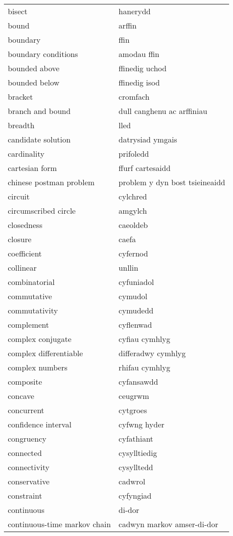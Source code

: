 \begin{supertabular}{p{0.22\textwidth}p{0.22\textwidth}}
bisect & hanerydd \\
bound & arffin \\
boundary & ffin \\
boundary conditions & amodau ffin \\
bounded above & ffinedig uchod \\
bounded below & ffinedig isod \\
bracket & cromfach \\
branch and bound & dull canghenu ac arffiniau \\
breadth & lled \\
candidate solution & datrysiad ymgais \\
cardinality & prifoledd \\
cartesian form & ffurf cartesaidd \\
chinese postman problem & problem y dyn bost tsieineaidd \\
circuit & cylchred \\
circumscribed circle & amgylch \\
closedness & caeoldeb \\
closure & caefa \\
coefficient & cyfernod \\
collinear & unllin \\
combinatorial & cyfuniadol \\
commutative & cymudol \\
commutativity & cymudedd \\
complement & cyflenwad \\
complex conjugate & cyfiau cymhlyg \\
complex differentiable & differadwy cymhlyg \\
complex numbers & rhifau cymhlyg \\
composite & cyfansawdd \\
concave & ceugrwm \\
concurrent & cytgroes \\
confidence interval & cyfwng hyder \\
congruency & cyfathiant \\
connected & cysylltiedig \\
connectivity & cysylltedd \\
conservative & cadwrol \\
constraint & cyfyngiad \\
continuous & di-dor \\
continuous-time markov chain & cadwyn markov amser-di-dor \\

\end{supertabular}
